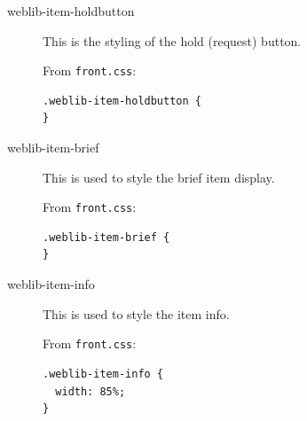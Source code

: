 \documentclass[letterpaper,twoside]{article}
\begin{document}
\begin{description}
\item[weblib-item-holdbutton] This is the styling of the hold (request) 
button.

From \texttt{front.css}:

\begin{verbatim}
.weblib-item-holdbutton {
}
\end{verbatim}

\item[weblib-item-brief] This is used to style the brief item display.

From \texttt{front.css}:

\begin{verbatim}
.weblib-item-brief {
}
\end{verbatim}

\item[weblib-item-info] This is used to style the item info.

From \texttt{front.css}:

\begin{verbatim}
.weblib-item-info {
  width: 85%;
}
\end{verbatim}
\end{description}
\end{document}
